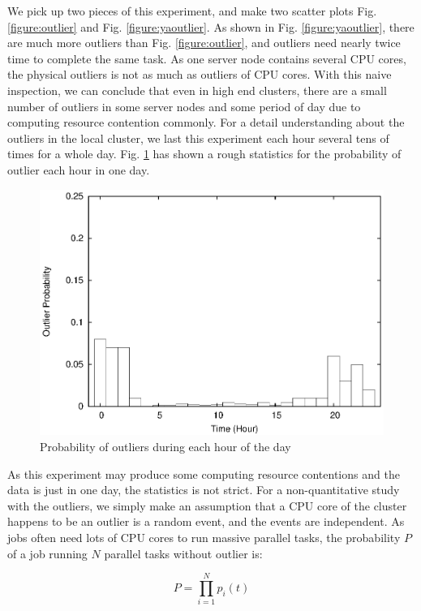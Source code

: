 We pick up two pieces of this experiment, and make two scatter plots Fig. \ref{figure:outlier} and Fig. \ref{figure:yaoutlier}. As shown in Fig. \ref{figure:yaoutlier}, there are much more outliers than Fig. \ref{figure:outlier}, and outliers need nearly twice time to complete the same task. As one server node contains several CPU cores, the physical outliers is not as much as outliers of CPU cores. With this naive inspection, we can conclude that even in high end clusters, there are a small number of outliers in some server nodes and some period of day due to computing resource contention commonly. For a detail understanding about the outliers in the local cluster, we last this experiment each hour several tens of times for a whole day. Fig. \ref{figure:outlier_stats} has shown a rough statistics for the probability of outlier each hour in one day.

\begin{figure}
\centering
\includegraphics[width=0.9\columnwidth]{figures/outlier_stats.eps}
\caption{Probability of outliers during each hour of the day}
\label{figure:outlier_stats}
\end{figure}

As this experiment may produce some computing resource contentions and the data is just in one day, the statistics is not strict. For a non-quantitative study with the outliers, we simply make an assumption that a CPU core of the cluster happens to be an outlier is a random event, and the events are independent. As jobs often need lots of CPU cores to run massive parallel tasks, the probability $P$ of a job running $N$ parallel tasks without outlier is:

$$P = \prod_{i=1}^N p_i(t)$$

